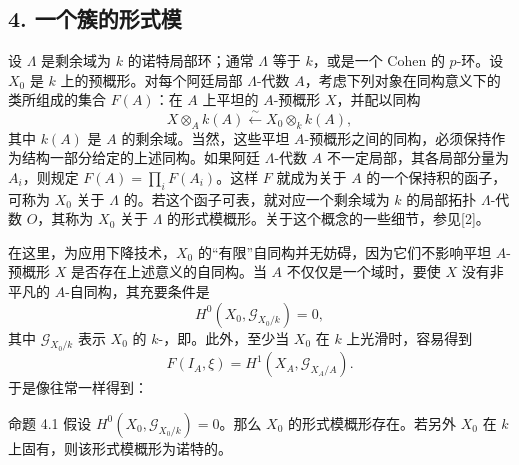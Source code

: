 \subsection*{4. 一个簇的形式模}
设 $\Lambda$ 是剩余域为 $k$ 的诺特局部环；通常 $\Lambda$ 等于 $k$，或是一个 Cohen 的 $p$-环。设 $X_0$ 是 $k$ 上的预概形。对每个阿廷局部 $\Lambda$-代数 $A$，考虑下列对象在同构意义下的类所组成的集合 $F(A)$：在 $A$ 上平坦的 $A$-预概形 $X$，并配以同构
\[
 X\otimes_A k(A)\xleftarrow{\sim}X_0\otimes_k k(A),\tag{*}
\]
其中 $k(A)$ 是 $A$ 的剩余域。当然，这些平坦 $A$-预概形之间的同构，必须保持作为结构一部分给定的上述同构。如果阿廷 $\Lambda$-代数 $A$ 不一定局部，其各局部分量为 $A_i$，则规定 $F(A)=\prod_iF(A_i)$。这样 $F$ 就成为关于 $A$ 的一个保持积的函子，可称为 $X_0$ 关于 $\Lambda$ 的。若这个函子可表，就对应一个剩余域为 $k$ 的局部拓扑 $\Lambda$-代数 $O$，其称为 $X_0$ 关于 $\Lambda$ 的形式模概形。关于这个概念的一些细节，参见[2]。

在这里，为应用下降技术，$X_0$ 的“有限”自同构并无妨碍，因为它们不影响平坦 $A$-预概形 $X$ 是否存在上述意义的自同构。当 $A$ 不仅仅是一个域时，要使 $X$ 没有非平凡的 $A$-自同构，其充要条件是
\[
 H^0(X_0,\mathcal G_{X_0/k})=0,
\]
其中 $\mathcal G_{X_0/k}$ 表示 $X_0$ 的 $k$-，即。此外，至少当 $X_0$ 在 $k$ 上光滑时，容易得到
\[
 F(I_A,\xi)=H^1(X_A,\mathcal G_{X_A/A}).
\]
于是像往常一样得到：

\begin{statement}{命题 4.1}
假设 $H^0(X_0,\mathcal G_{X_0/k})=0$。那么 $X_0$ 的形式模概形存在。若另外 $X_0$ 在 $k$ 上固有，则该形式模概形为诺特的。
\end{statement}
